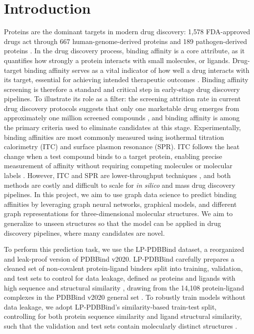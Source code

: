 \documentclass[conference]{IEEEtran}
\begin{document}
\section{Introduction}
Proteins are the dominant targets in modern drug discovery: 1,578 FDA-approved drugs act through 667 human-genome-derived proteins and 189 pathogen-derived proteins \cite{santos2017comprehensive}. In the drug discovery process, binding affinity is a core attribute, as it quantifies how strongly a protein interacts with small molecules, or ligands. Drug-target binding affinity serves as a vital indicator of how well a drug interacts with its target, essential for achieving intended therapeutic outcomes \cite{shaker2021drug}. Binding affinity screening is therefore a standard and critical step in early-stage drug discovery pipelines. To illustrate its role as a filter: the screening attrition rate in current drug discovery protocols suggests that only one marketable drug emerges from approximately one million screened compounds \cite{berdasco2020hts}, and binding affinity is among the primary criteria used to eliminate candidates at this stage. Experimentally, binding affinities are most commonly measured using isothermal titration calorimetry (ITC) and surface plasmon resonance (SPR). ITC follows the heat change when a test compound binds to a target protein, enabling precise measurement of affinity without requiring competing molecules or molecular labels \cite{freyer2008itc}. However, ITC and SPR are lower-throughput techniques \cite{freyer2008itc}, and both methods are costly and difficult to scale for \textit{in silico} and mass drug discovery pipelines. In this project, we aim to use graph data science to predict binding affinities by leveraging graph neural networks, graphical models, and different graph representations for three-dimensional molecular structures. We aim to generalize to unseen structures so that the model can be applied in drug discovery pipelines, where many candidates are novel.

To perform this prediction task, we use the LP-PDBBind dataset, a reorganized and leak-proof version of PDBBind v2020. LP-PDBBind carefully prepares a cleaned set of non-covalent protein-ligand binders split into training, validation, and test sets to control for data leakage, defined as proteins and ligands with high sequence and structural similarity \cite{ha2023lp}, drawing from the 14,108 protein-ligand complexes in the PDBBind v2020 general set \cite{liu2015pdbbind}. To robustly train models without data leakage, we adopt LP-PDBBind's similarity-based train-test split, controlling for both protein sequence similarity and ligand structural similarity, such that the validation and test sets contain molecularly distinct structures \cite{ha2023lp}.
\end{document}
